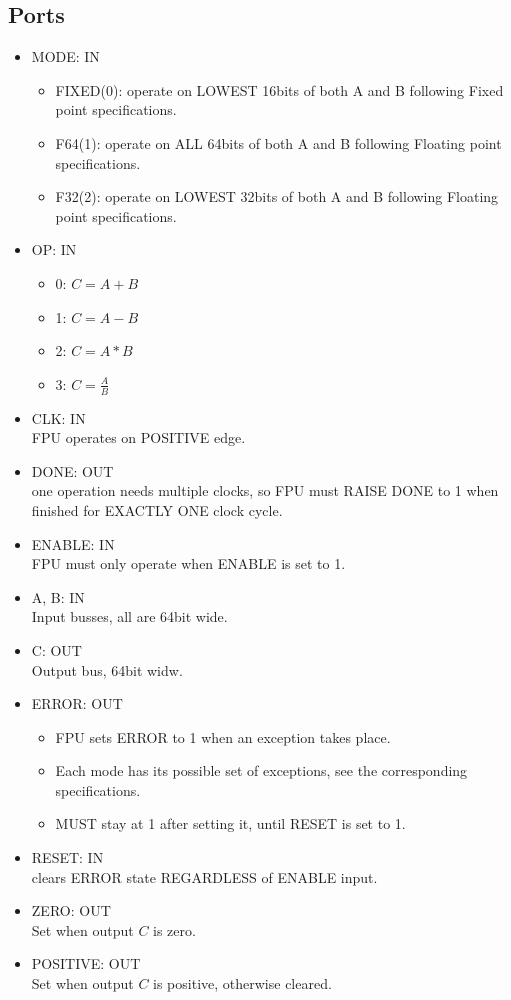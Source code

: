 \documentclass[12pt]{report}
\begin{document}
\subsection{Ports}
\begin{itemize}
    \item MODE: IN
    \begin{itemize}
        \item FIXED(0): operate on LOWEST 16bits of both A and B following Fixed point specifications.
        \item F64(1): operate on ALL 64bits of both A and B following Floating point specifications.
        \item F32(2): operate on LOWEST 32bits of both A and B following Floating point specifications.
    \end{itemize}
    \item OP: IN
    \begin{itemize}
        \item 0: $C = A + B$ 
        \item 1: $C = A - B$ 
        \item 2: $C = A * B$ 
        \item 3: $C = \frac{A}{B}$  
    \end{itemize}
    \item CLK: IN\\
        FPU operates on POSITIVE edge.
    \item DONE: OUT\\ 
    one operation needs multiple clocks, so FPU must RAISE DONE to 1 when finished for EXACTLY ONE clock cycle.
    \item ENABLE: IN\\
    FPU must only operate when ENABLE is set to 1.
    \item A, B: IN\\
    Input busses, all are 64bit wide.
    \item C: OUT\\
    Output bus, 64bit widw.
    \item ERROR: OUT
    \begin{itemize}
        \item FPU sets ERROR to 1 when an exception takes place. 
        \item Each mode has its possible set of exceptions, see the corresponding specifications. 
        \item MUST stay at 1 after setting it, until RESET is set to 1.
    \end{itemize}
    \item RESET: IN\\
    clears ERROR state REGARDLESS of ENABLE input.
    \item ZERO: OUT\\
    Set when output $C$ is zero.
    \item POSITIVE: OUT\\
    Set when output $C$ is positive, otherwise cleared.
\end{itemize}
\end{document}
